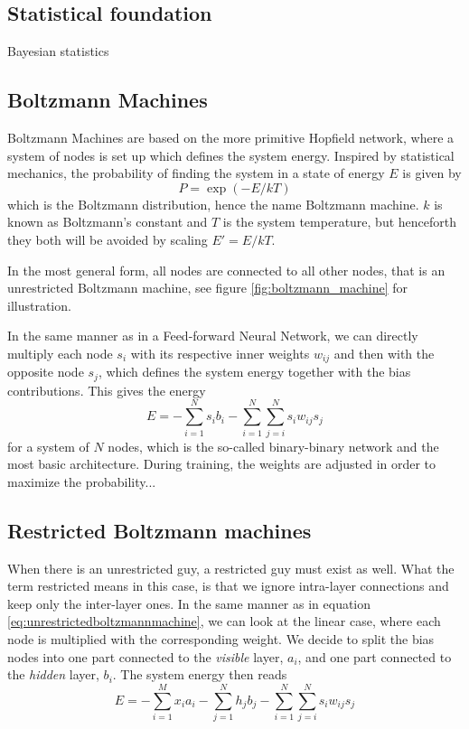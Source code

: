 \subsection{Statistical foundation}
Bayesian statistics

\subsection{Boltzmann Machines}
Boltzmann Machines are based on the more primitive Hopfield network, where a system of nodes is set up which defines the system energy. Inspired by statistical mechanics, the probability of finding the system in a state of energy $E$ is given by
\begin{equation}
P=\exp(-E/kT)
\end{equation}
which is the Boltzmann distribution, hence the name Boltzmann machine. $k$ is known as Boltzmann's constant and $T$ is the system temperature, but henceforth they both will be avoided by scaling $E'=E/kT$. 

In the most general form, all nodes are connected to all other nodes, that is an unrestricted Boltzmann machine, see figure \eqref{fig:boltzmann_machine} for illustration. 



In the same manner as in a Feed-forward Neural Network, we can directly multiply each node $s_i$ with its respective inner weights $w_{ij}$ and then with the opposite node $s_j$, which defines the system energy together with the bias contributions. This gives the energy
\begin{equation}
E=- \sum_{i=1}^Ns_ib_i-\sum_{i=1}^N\sum_{j=i}^N s_iw_{ij}s_j 
\label{eq:unrestrictedboltzmannmachine}
\end{equation}
for a system of $N$ nodes, which is the so-called binary-binary network and the most basic architecture. During training, the weights are adjusted in order to maximize the probability...

\subsection{Restricted Boltzmann machines}
When there is an unrestricted guy, a restricted guy must exist as well. What the term restricted means in this case, is that we ignore intra-layer connections and keep only the inter-layer ones. In the same manner as in equation \eqref{eq:unrestrictedboltzmannmachine}, we can look at the linear case, where each node is multiplied with the corresponding weight. We decide to split the bias nodes into one part connected to the \textit{visible} layer, $a_i$, and one part connected to the \textit{hidden} layer, $b_i$. The system energy then reads
\begin{equation}
E=- \sum_{i=1}^Mx_ia_i- \sum_{j=1}^Nh_jb_j-\sum_{i=1}^N\sum_{j=i}^N s_iw_{ij}s_j 
\label{eq:binarybinary}
\end{equation}

